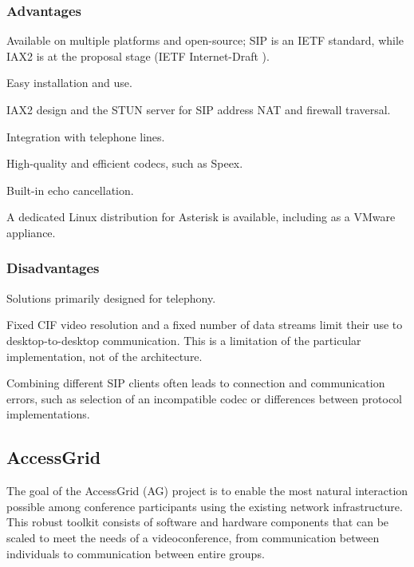 \subsubsection*{Advantages}
\begin{paklist}
\item Available on multiple platforms and open-source; SIP is an IETF standard, while IAX2 is at the proposal stage (IETF Internet-Draft \cite{IETFDraft-IAX2}).
\item Easy installation and use.
\item IAX2 design and the STUN server for SIP address NAT and firewall traversal.
\item Integration with telephone lines.
\item High-quality and efficient codecs, such as Speex.
\item Built-in echo cancellation.
\item A dedicated Linux distribution for Asterisk is available, including as a VMware appliance.
\end{paklist}

\subsubsection*{Disadvantages}
\begin{paklist}
\item Solutions primarily designed for telephony.
\item Fixed CIF video resolution and a fixed number of data streams limit their use to desktop-to-desktop communication. This is a limitation of the particular implementation, not of the architecture.
\item Combining different SIP clients often leads to connection and communication errors, such as selection of an incompatible codec or differences between protocol implementations.
\end{paklist}


\subsection{AccessGrid}\label{kap:AccessGrid}

The goal of the AccessGrid (AG) project is to enable the most natural interaction possible among conference participants using the existing network infrastructure. This robust toolkit consists of software and hardware components that can be scaled to meet the needs of a videoconference, from communication between individuals to communication between entire groups.

